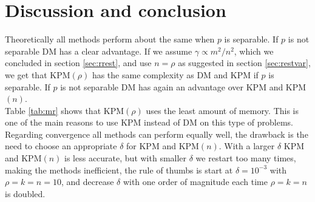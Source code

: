 \chapter{Discussion and conclusion}%
Theoretically all methods perform about the same when $p$ is separable. If $p$ is not separable DM has a clear advantage. If we assume $\gamma \propto m^2/n^2$, which we concluded in section \ref{sec:rrest}, and use $n = \rho$ as suggested in section \ref{sec:restvar}, we get that KPM$(\rho)$ has the same complexity as DM and KPM if $p$ is separable. If $p$ is not separable DM has again an advantage over KPM and KPM$(n)$. \\

Table \ref{tab:mr} shows that KPM$(\rho)$ uses the least amount of memory. This is one of the main reasons to use KPM instead of DM on this type of problems. \\


Regarding convergence all methods can perform equally well, the drawback is the need to choose an appropriate $\delta$ for KPM and KPM$(n)$. With a larger $\delta$ KPM and KPM$(n)$ is less accurate, but with smaller $\delta$ we restart too many times, making the methods inefficient, the rule of thumbs is start at $\delta=10^{-3}$ with $\rho = k = n = 10$, and decrease $\delta$ with one order of magnitude each time $\rho = k = n$ is doubled. \\

